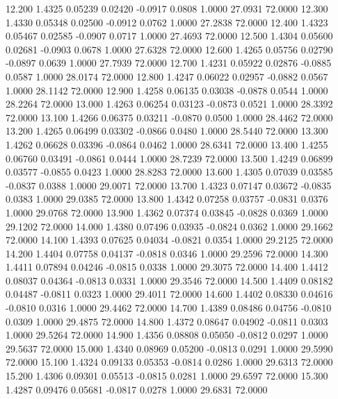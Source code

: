   12.200   1.4325   0.05239   0.02420  -0.0917   0.0808   1.0000  27.0931  72.0000
  12.300   1.4330   0.05348   0.02500  -0.0912   0.0762   1.0000  27.2838  72.0000
  12.400   1.4323   0.05467   0.02585  -0.0907   0.0717   1.0000  27.4693  72.0000
  12.500   1.4304   0.05600   0.02681  -0.0903   0.0678   1.0000  27.6328  72.0000
  12.600   1.4265   0.05756   0.02790  -0.0897   0.0639   1.0000  27.7939  72.0000
  12.700   1.4231   0.05922   0.02876  -0.0885   0.0587   1.0000  28.0174  72.0000
  12.800   1.4247   0.06022   0.02957  -0.0882   0.0567   1.0000  28.1142  72.0000
  12.900   1.4258   0.06135   0.03038  -0.0878   0.0544   1.0000  28.2264  72.0000
  13.000   1.4263   0.06254   0.03123  -0.0873   0.0521   1.0000  28.3392  72.0000
  13.100   1.4266   0.06375   0.03211  -0.0870   0.0500   1.0000  28.4462  72.0000
  13.200   1.4265   0.06499   0.03302  -0.0866   0.0480   1.0000  28.5440  72.0000
  13.300   1.4262   0.06628   0.03396  -0.0864   0.0462   1.0000  28.6341  72.0000
  13.400   1.4255   0.06760   0.03491  -0.0861   0.0444   1.0000  28.7239  72.0000
  13.500   1.4249   0.06899   0.03577  -0.0855   0.0423   1.0000  28.8283  72.0000
  13.600   1.4305   0.07039   0.03585  -0.0837   0.0388   1.0000  29.0071  72.0000
  13.700   1.4323   0.07147   0.03672  -0.0835   0.0383   1.0000  29.0385  72.0000
  13.800   1.4342   0.07258   0.03757  -0.0831   0.0376   1.0000  29.0768  72.0000
  13.900   1.4362   0.07374   0.03845  -0.0828   0.0369   1.0000  29.1202  72.0000
  14.000   1.4380   0.07496   0.03935  -0.0824   0.0362   1.0000  29.1662  72.0000
  14.100   1.4393   0.07625   0.04034  -0.0821   0.0354   1.0000  29.2125  72.0000
  14.200   1.4404   0.07758   0.04137  -0.0818   0.0346   1.0000  29.2596  72.0000
  14.300   1.4411   0.07894   0.04246  -0.0815   0.0338   1.0000  29.3075  72.0000
  14.400   1.4412   0.08037   0.04364  -0.0813   0.0331   1.0000  29.3546  72.0000
  14.500   1.4409   0.08182   0.04487  -0.0811   0.0323   1.0000  29.4011  72.0000
  14.600   1.4402   0.08330   0.04616  -0.0810   0.0316   1.0000  29.4462  72.0000
  14.700   1.4389   0.08486   0.04756  -0.0810   0.0309   1.0000  29.4875  72.0000
  14.800   1.4372   0.08647   0.04902  -0.0811   0.0303   1.0000  29.5264  72.0000
  14.900   1.4356   0.08808   0.05050  -0.0812   0.0297   1.0000  29.5637  72.0000
  15.000   1.4340   0.08969   0.05200  -0.0813   0.0291   1.0000  29.5990  72.0000
  15.100   1.4324   0.09133   0.05353  -0.0814   0.0286   1.0000  29.6313  72.0000
  15.200   1.4306   0.09301   0.05513  -0.0815   0.0281   1.0000  29.6597  72.0000
  15.300   1.4287   0.09476   0.05681  -0.0817   0.0278   1.0000  29.6831  72.0000
